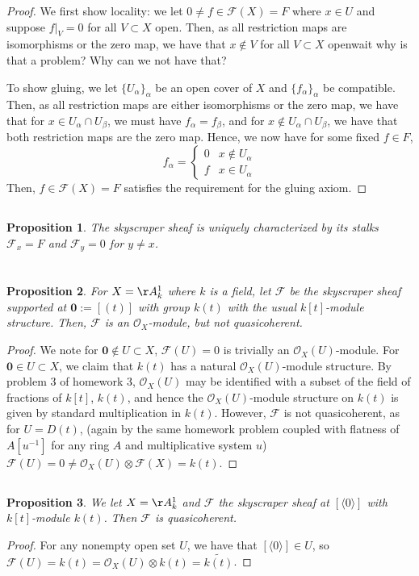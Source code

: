 \documentclass[english]{article}
\renewcommand\vec{\mathbf}
\newcommand{\evat}[3]{\left. #1\right|_{#2}^{#3}}
\newcommand{\OO}{\mathcal{O}}
\newcommand{\FF}{\mathscr{F}}
\newcommand{\prob}[1]{\setcounter{section}{#1-1}\section{}}
\newcommand{\prt}[1]{\setcounter{subsection}{#1-1}\subsection{}}
\newtheorem*{proposition*}{Proposition}
\theoremstyle{remark}
\theoremstyle{definition}
\newcommand{\restr}[2]{\evat{#1}{#2}{}}
\begin{document}
\begin{proof}
	We first show locality: we let $0\neq f\in \FF(X)=F$ where $x\in U$ and suppose $\restr{f}{V}=0$ for all $V\subset X$ open. Then, as all restriction maps are isomorphisms or the zero map, we have that $x\notin V$ for all $V\subset X$ open\textellipsis wait why is that a problem? Why can we not have that?
	
	To show gluing, we let $\{U_\alpha\}_{\alpha}$ be an open cover of $X$ and $\{f_\alpha\}_{\alpha}$ be compatible. Then, as all restriction maps are either isomorphisms or the zero map, we have that for $x\in U_\alpha\cap U_\beta$, we must have $f_\alpha=f_\beta$, and for $x\notin U_\alpha\cap U_\beta$, we have that both restriction maps are the zero map. Hence, we now have for some fixed $f\in F$, \begin{equation*}
		f_\alpha=\begin{cases}
		0&x\notin U_\alpha\\
		f&x\in U_\alpha
		\end{cases}
	\end{equation*}
	Then, $f\in \FF(X)=F$ satisfies the requirement for the gluing axiom. 
\end{proof}
\prt{2}\begin{proposition*}
	The skyscraper sheaf is uniquely characterized by its stalks $\FF_x=F$ and $\FF_y=0$ for $y\neq x$. 
\end{proposition*}
\prob{6}\prt{1}\begin{proposition*}
	For $X=\AA_k^1$ where $k$ is a field, let $\FF$ be the skyscraper sheaf supported at $\vec{0}:=[(t)]$ with group $k(t)$ with the usual $k[t]$-module structure. Then, $\FF$ is an $\OO_X$-module, but not quasicoherent.
\end{proposition*}
\begin{proof}
	We note for $\vec{0}\notin U\subset X$, $\FF(U)=0$ is trivially an $\OO_X(U)$-module. For $\vec{0}\in U\subset X$, we claim that $k(t)$ has a natural $\OO_X(U)$-module structure. By problem 3 of homework 3, $\OO_X(U)$ may be identified with a subset of the field of fractions of $k[t]$, $k(t)$, and hence the $\OO_X(U)$-module structure on $k(t)$ is given by standard multiplication in $k(t)$. However, $\FF$ is not quasicoherent, as for $U=D(t)$, (again by the same homework problem coupled with flatness of $A[u^{-1}]$ for any ring $A$ and multiplicative system $u$) $\FF(U)=0\neq \OO_X(U)\otimes \FF(X)=k(t)$.
\end{proof}
\prt{2} \begin{proposition*}
We let $X=\AA_k^1$ and $\FF$ the skyscraper sheaf at $[\langle 0\rangle ]$ with $k[t]$-module $k(t)$. Then $\FF$ is quasicoherent.
\end{proposition*}\begin{proof}
For any nonempty open set $U$, we have that $[\langle 0 \rangle]\in U $, so $\FF(U)=k(t)=\OO_X(U)\otimes k(t)=\tilde{k(t)}$. 
\end{proof}
\end{document}
